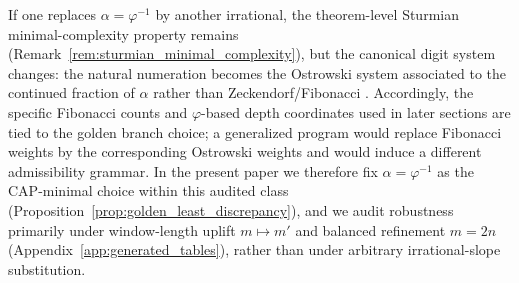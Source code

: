 \begin{remark}\label{rem:alpha_variation}
If one replaces $\alpha=\varphi^{-1}$ by another irrational, the theorem-level Sturmian minimal-complexity property remains (Remark~\ref{rem:sturmian_minimal_complexity}), but the canonical digit system changes: the natural numeration becomes the Ostrowski system associated to the continued fraction of $\alpha$ rather than Zeckendorf/Fibonacci \cite{AlloucheShallit2003,Lothaire2002}.
Accordingly, the specific Fibonacci counts and $\varphi$-based depth coordinates used in later sections are tied to the golden branch choice; a generalized program would replace Fibonacci weights by the corresponding Ostrowski weights and would induce a different admissibility grammar.
In the present paper we therefore fix $\alpha=\varphi^{-1}$ as the CAP-minimal choice within this audited class (Proposition~\ref{prop:golden_least_discrepancy}), and we audit robustness primarily under window-length uplift $m\mapsto m'$ and balanced refinement $m=2n$ (Appendix~\ref{app:generated_tables}), rather than under arbitrary irrational-slope substitution.
\end{remark}


